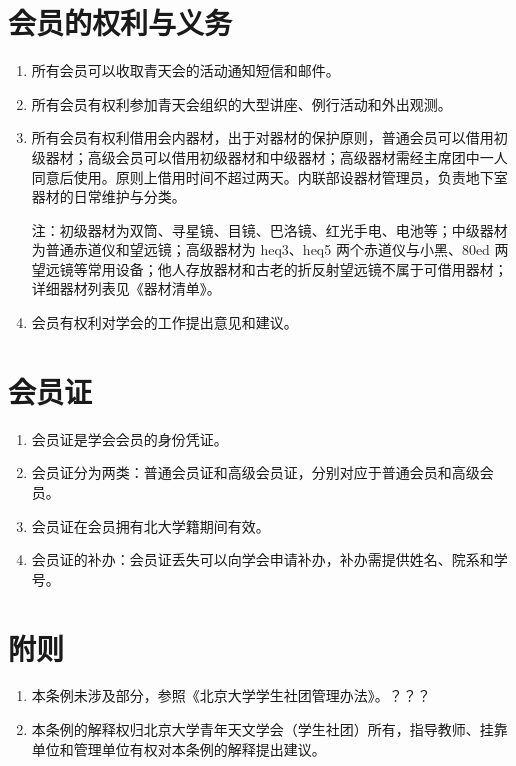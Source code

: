\section{会员的权利与义务}

\begin{enumerate}[resume]
    \item 所有会员可以收取青天会的活动通知短信和邮件。
    
    \item 所有会员有权利参加青天会组织的大型讲座、例行活动和外出观测。
    
    \item 所有会员有权利借用会内器材，出于对器材的保护原则，普通会员可以借用初级器材；高级会员可以借用初级器材和中级器材；高级器材需经主席团中一人同意后使用。原则上借用时间不超过两天。内联部设器材管理员，负责地下室器材的日常维护与分类。
    
    注：初级器材为双筒、寻星镜、目镜、巴洛镜、红光手电、电池等；中级器材为普通赤道仪和望远镜；高级器材为 heq3、heq5 两个赤道仪与小黑、80ed 两望远镜等常用设备；他人存放器材和古老的折反射望远镜不属于可借用器材；详细器材列表见《器材清单》。
    
    \item 会员有权利对学会的工作提出意见和建议。
\end{enumerate}

\section{会员证}

\begin{enumerate}[resume]
    \item 会员证是学会会员的身份凭证。
    
    \item 会员证分为两类：普通会员证和高级会员证，分别对应于普通会员和高级会员。
    
    \item 会员证在会员拥有北大学籍期间有效。
    
    \item 会员证的补办：会员证丢失可以向学会申请补办，补办需提供姓名、院系和学号。
\end{enumerate}

\section{附则}

\begin{enumerate}[resume]        
    \item 本条例未涉及部分，参照《北京大学学生社团管理办法》。？？？

    \item 本条例的解释权归北京大学青年天文学会（学生社团）所有，指导教师、挂靠单位和管理单位有权对本条例的解释提出建议。
\end{enumerate}
